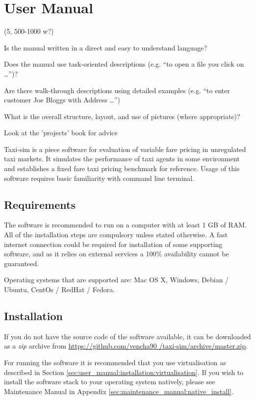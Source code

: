 \newpage
\section{User Manual}
\label{sec:user_manual}


(5, 500-1000 w?)

Is the manual written in a direct and easy to understand language?

Does the manual use task-oriented descriptions (e.g. “to open a file you click
on …”)?

Are there walk-through descriptions using detailed examples (e.g. “to enter
customer Joe Bloggs with Address …”)

What is the overall structure, layout, and use of pictures (where appropriate)?

Look at the 'projects' book for advice


Taxi-sim is a piece software for evaluation of variable fare pricing in
unregulated taxi markets. It simulates the performance of taxi agents in some
environment and establishes a fixed fare taxi pricing benchmark for reference.
Usage of this software requires basic familiarity with command line terminal.


\subsection{Requirements}

The software is recommended to run on a computer with at least 1 GB of RAM. All
of the installation steps are compulsory unless stated otherwise. A fast
internet connection could be required for installation of some supporting
software, and as it relies on external services a 100\% availability cannot be
guaranteed.

Operating systems that are supported are: Mac OS X, Windows, Debian / Ubuntu,
CentOs / RedHat / Fedora.


\subsection{Installation}
\label{sec:user_manual:installation}

If you do not have the source code of the software available, it can be
downloaded as a \textit{zip} archive from \url{https://github.com/vencha90
/taxi-sim/archive/master.zip}.

For running the software it is recommended that you use virtualisation as
described in Section \ref{sec:user_manual:installation:virtualisation}. If you
wish to install the software stack to your operating system natively, please
see Maintenance Manual in Appendix \ref{sec:maintenance_manual:native_install}.


